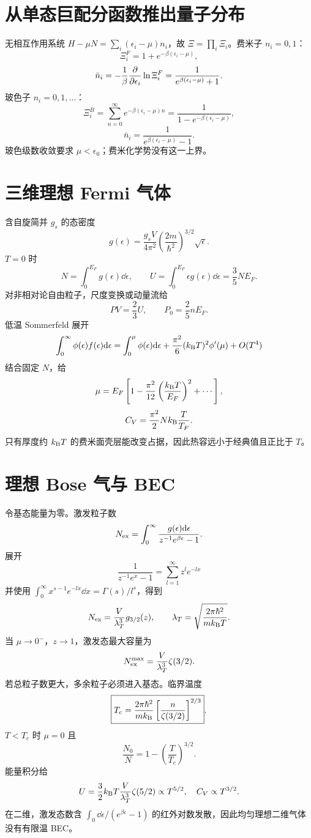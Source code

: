 \section{从单态巨配分函数推出量子分布}
无相互作用系统 $H-\mu N=\sum_i(\epsilon_i-\mu)n_i$，故
$\Xi=\prod_i\Xi_i$。费米子 $n_i=0,1$：
\[
\Xi_i^{F}=1+e^{-\beta(\epsilon_i-\mu)},
\]
\[
\bar n_i
=-\frac1\beta\frac{\partial }{\partial \epsilon_i}\ln\Xi_i^F
=\frac1{e^{\beta(\epsilon_i-\mu)}+1}.
\]
玻色子 $n_i=0,1,\ldots$：
\[
\Xi_i^B=\sum_{n=0}^\infty
e^{-\beta(\epsilon_i-\mu)n}
=\frac1{1-e^{-\beta(\epsilon_i-\mu)}},
\]
\[
\bar n_i=\frac1{e^{\beta(\epsilon_i-\mu)}-1}.
\]
玻色级数收敛要求 $\mu<\epsilon_0$；费米化学势没有这一上界。

\section{三维理想 Fermi 气体}
含自旋简并 $g_s$ 的态密度
\[
g(\epsilon)=\frac{g_sV}{4\pi^2}
\left(\frac{2m}{\hbar^2}\right)^{3/2}\sqrt\epsilon.
\]
$T=0$ 时
\[
N=\int_0^{E_F}g(\epsilon)\dd\epsilon,\qquad
U=\int_0^{E_F}\epsilon g(\epsilon)\dd\epsilon
=\frac35NE_F.
\]
对非相对论自由粒子，尺度变换或动量流给
\[
\boxed{PV=\frac23U},\qquad
P_0=\frac25nE_F.
\]
低温 Sommerfeld 展开
\[
\int_0^\infty\phi(\epsilon)f(\epsilon)\mathrm d\epsilon
=\int_0^\mu\phi(\epsilon)\mathrm d\epsilon
+\frac{\pi^2}{6}(k_{\mathrm B} T)^2\phi'(\mu)+O(T^4)
\]
结合固定 $N$，给
\[
\mu=E_F\left[1-\frac{\pi^2}{12}
\left(\frac{k_{\mathrm B} T}{E_F}\right)^2+\cdots\right],
\]
\[
C_V=\frac{\pi^2}{2}Nk_{\mathrm B}\frac{T}{T_F}.
\]
只有厚度约 $k_{\mathrm B} T$ 的费米面壳层能改变占据，因此热容远小于经典值且正比于 $T$。

\section{理想 Bose 气与 BEC}
令基态能量为零。激发粒子数
\[
N_{\rm ex}=\int_0^\infty
\frac{g(\epsilon)\mathrm d\epsilon}{z^{-1}e^{\beta\epsilon}-1}.
\]
展开
\[
\frac1{z^{-1}e^x-1}=\sum_{l=1}^\infty z^le^{-lx}
\]
并使用
$\int_0^\infty x^{s-1}e^{-lx}\dd x=\Gamma(s)/l^s$，得到
\[
N_{\rm ex}=\frac{V}{\lambda_T^3}g_{3/2}(z),
\qquad
\lambda_T=\sqrt{\frac{2\pi\hbar^2}{mk_{\mathrm B} T}}.
\]
当 $\mu\to0^-$，$z\to1$，激发态最大容量为
\[
N_{\rm ex}^{\max}=\frac{V}{\lambda_T^3}\zeta(3/2).
\]
若总粒子数更大，多余粒子必须进入基态。临界温度
\[
\boxed{
T_c=\frac{2\pi\hbar^2}{mk_{\mathrm B}}
\left[\frac{n}{\zeta(3/2)}\right]^{2/3}}.
\]
$T<T_c$ 时 $\mu=0$ 且
\[
\boxed{\frac{N_0}{N}=1-\left(\frac T{T_c}\right)^{3/2}}.
\]
能量积分给
\[
U=\frac32k_{\mathrm B} T\frac{V}{\lambda_T^3}\zeta(5/2)
\propto T^{5/2},
\quad C_V\propto T^{3/2}.
\]
在二维，激发态数含
$\int_0\dd\epsilon/(e^{\beta\epsilon}-1)$ 的红外对数发散，因此均匀理想二维气体没有有限温 BEC。

